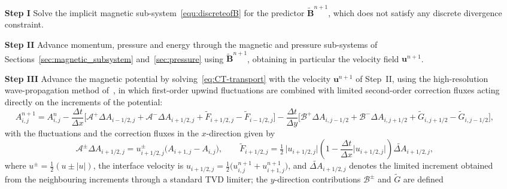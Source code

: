 \documentclass[a4paper,fleqn]{cas-sc}
\theoremstyle{definition}
\theoremstyle{remark}
\begin{document}
\begin{itemize}
\item[\textbf{Step I}] Solve the implicit magnetic sub-system~\eqref{equ:discreteofB}
      for the predictor $\tilde{\mathbf B}^{n+1}$, which does not satisfy any
      discrete divergence constraint.
\item[\textbf{Step II}] Advance momentum, pressure and energy through the
      magnetic and pressure sub-systems of Sections~\ref{sec:magnetic_subsystem}
      and~\ref{sec:pressure} using $\tilde{\mathbf B}^{n+1}$, obtaining in
      particular the velocity field $\mathbf u^{n+1}$.
\item[\textbf{Step III}] Advance the magnetic potential
      by solving~\eqref{eq:CT-transport} with the velocity $\mathbf u^{n+1}$
      of Step~II, using the high-resolution wave-propagation method
      of~\cite{Rossmanith2006,leVeque2002}, in which first-order upwind
      fluctuations are combined with limited second-order correction fluxes
      acting directly on the increments of the potential:
      \begin{equation}
      \label{eq:CT-wp}
      A^{n+1}_{i,j} = A^{n}_{i,j}
      - \frac{\Delta t}{\Delta x}\Big[\mathcal A^{+}\!\Delta A_{i-1/2,j}
                                    + \mathcal A^{-}\!\Delta A_{i+1/2,j}
                                    + \tilde F_{i+1/2,j}-\tilde F_{i-1/2,j}\Big]
      - \frac{\Delta t}{\Delta y}\Big[\mathcal B^{+}\!\Delta A_{i,j-1/2}
                                    + \mathcal B^{-}\!\Delta A_{i,j+1/2}
                                    + \tilde G_{i,j+1/2}-\tilde G_{i,j-1/2}\Big],
      \end{equation}
      with the fluctuations and the correction fluxes in the $x$-direction
      given by
      \begin{equation}
      \label{eq:CT-wp-fluct}
      \mathcal A^{\pm}\!\Delta A_{i+1/2,j}
        = u^{\pm}_{i+1/2,j}\big(A_{i+1,j}-A_{i,j}\big),
      \qquad
      \tilde F_{i+1/2,j}
        = \tfrac12\,\big|u_{i+1/2,j}\big|
          \left(1-\frac{\Delta t}{\Delta x}\big|u_{i+1/2,j}\big|\right)
          \widetilde{\Delta A}_{i+1/2,j},
      \end{equation}
      where $u^{\pm}=\tfrac12(u\pm|u|)$, the interface velocity is
      $u_{i+1/2,j}=\tfrac12\big(u^{n+1}_{i,j}+u^{n+1}_{i+1,j}\big)$, and
      $\widetilde{\Delta A}_{i+1/2,j}$ denotes the limited increment obtained
      from the neighbouring increments through a standard TVD limiter; the
      $y$-direction contributions $\mathcal B^{\pm}$ and $\tilde G$ are defined

\end{itemize}
\end{document}
